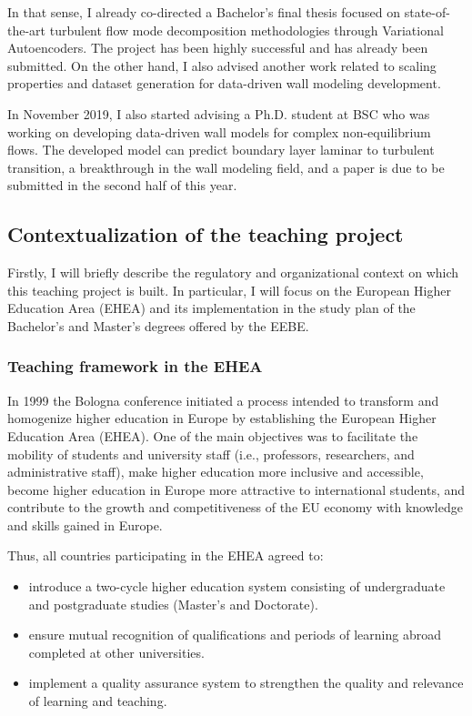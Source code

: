 \documentclass{article}
\begin{document}
In that sense, I already co-directed a Bachelor's final thesis focused on state-of-the-art turbulent flow mode decomposition methodologies through Variational Autoencoders. The project has been highly successful and has already been submitted. On the other hand, I also advised another work related to scaling properties and dataset generation for data-driven wall modeling development. 

In November 2019, I also started advising a Ph.D. student at BSC who was working on developing data-driven wall models for complex non-equilibrium flows. The developed model can predict boundary layer laminar to turbulent transition, a breakthrough in the wall modeling field, and a paper is due to be submitted in the second half of this year.  

\subsection{Contextualization of the teaching project}


Firstly, I will briefly describe the regulatory and organizational context on which this teaching project is built. In particular, I will focus on the European Higher Education Area (EHEA) and its implementation in the study plan of the Bachelor's and Master's degrees offered by the EEBE.

\subsubsection{Teaching framework in the EHEA}

In 1999 the Bologna conference initiated a process intended to transform and homogenize higher education in Europe by establishing the European Higher Education Area (EHEA). One of the main objectives was to facilitate the mobility of students and university staff (i.e., professors, researchers, and administrative staff), make higher education more inclusive and accessible, become higher education in Europe more attractive to international students, and contribute to the growth and competitiveness of the EU economy with knowledge and skills gained in Europe.

Thus, all countries participating in the EHEA agreed to:
\begin{itemize}
\item introduce a two-cycle higher education system consisting of undergraduate and
postgraduate studies (Master's and Doctorate).
\item ensure mutual recognition of qualifications and periods of learning abroad completed at other universities.
\item implement a quality assurance system to strengthen the quality and relevance of learning and teaching.
\end{itemize}
\end{document}
